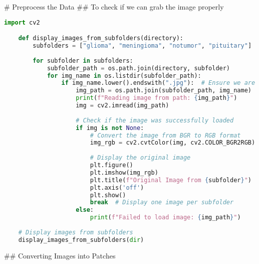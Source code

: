 # Preprocess the Data
## To check if we can grab the image properly
\begin{lstlisting}[language=Python]
    import cv2

    def display_images_from_subfolders(directory):
        subfolders = ["glioma", "meningioma", "notumor", "pituitary"]
    
        for subfolder in subfolders:
            subfolder_path = os.path.join(directory, subfolder)
            for img_name in os.listdir(subfolder_path):
                if img_name.lower().endswith(".jpg"):  # Ensure we are reading .jpg files
                    img_path = os.path.join(subfolder_path, img_name)
                    print(f"Reading image from path: {img_path}")
                    img = cv2.imread(img_path)
    
                    # Check if the image was successfully loaded
                    if img is not None:
                        # Convert the image from BGR to RGB format
                        img_rgb = cv2.cvtColor(img, cv2.COLOR_BGR2RGB)
    
                        # Display the original image
                        plt.figure()
                        plt.imshow(img_rgb)
                        plt.title(f"Original Image from {subfolder}")
                        plt.axis('off')
                        plt.show()
                        break  # Display one image per subfolder
                    else:
                        print(f"Failed to load image: {img_path}")
    
    # Display images from subfolders
    display_images_from_subfolders(dir)
\end{lstlisting}


## Converting Images into Patches

